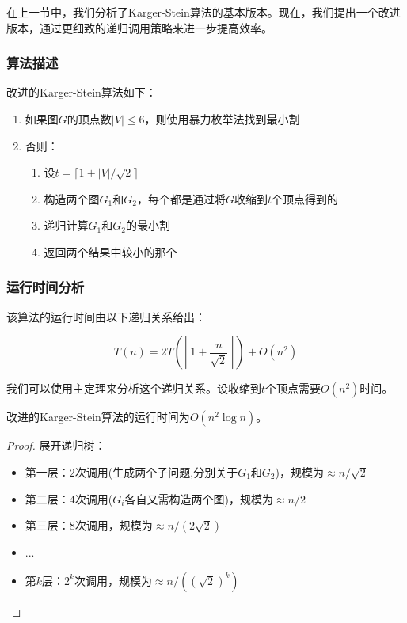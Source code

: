 \documentclass[lang=cn,newtx,10pt,scheme=chinese,chinesefont=nofont,citestyle=gb7714-2015, bibstyle=gb7714-2015]{elegantbook}
\begin{document}
\begin{refsection}
在上一节中，我们分析了Karger-Stein算法的基本版本。现在，我们提出一个改进版本，通过更细致的递归调用策略来进一步提高效率。

\subsubsection{算法描述}

改进的Karger-Stein算法如下：

\begin{enumerate}
    \item 如果图$G$的顶点数$|V| \leq 6$，则使用暴力枚举法找到最小割
    \item 否则：
    \begin{enumerate}
        \item 设$t = \lceil 1 + |V|/\sqrt{2} \rceil$
        \item 构造两个图$G_1$和$G_2$，每个都是通过将$G$收缩到$t$个顶点得到的
        \item 递归计算$G_1$和$G_2$的最小割
        \item 返回两个结果中较小的那个
    \end{enumerate}
\end{enumerate}

\subsubsection{运行时间分析}

该算法的运行时间由以下递归关系给出：

\begin{equation*}
    T(n) = 2T\left(\left\lceil 1 + \frac{n}{\sqrt{2}} \right\rceil\right) + O(n^2)
\end{equation*}

我们可以使用主定理来分析这个递归关系。设收缩到$t$个顶点需要$O(n^2)$时间。

\begin{theorem}
改进的Karger-Stein算法的运行时间为$O(n^2 \log n)$。
\end{theorem}

\begin{proof}
展开递归树：
\begin{itemize}
    \item 第一层：$2$次调用(生成两个子问题,分别关于$G_1$和$G_2$)，规模为$\approx n/\sqrt{2}$
    \item 第二层：$4$次调用($G_i$各自又需构造两个图)，规模为$\approx n/2$
    \item 第三层：$8$次调用，规模为$\approx n/(2\sqrt{2})$
    \item ...
    \item 第$k$层：$2^k$次调用，规模为$\approx n/((\sqrt{2})^k)$
\end{itemize}


\end{proof}
\end{refsection}
\end{document}
